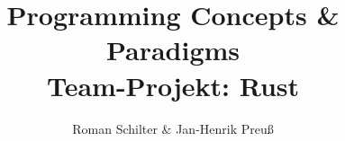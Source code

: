 \documentclass[aspectratio=169, professionalfonts]{beamer}
\title[PCP-Rust]{Programming Concepts \& Paradigms\\ Team-Projekt: Rust}
\author[Schilter \& Preuß]{Roman Schilter \& Jan-Henrik Preuß}
\begin{document}
\typesetFrontSlides















\end{document}
